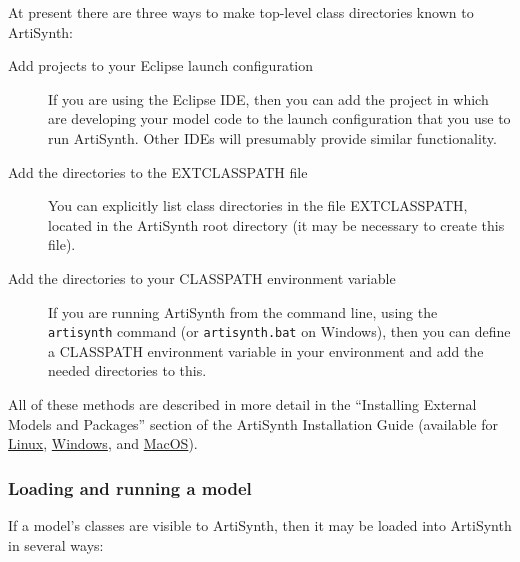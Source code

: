 At present there are three ways to make top-level class directories
known to ArtiSynth:

\begin{description}

\item[Add projects to your Eclipse launch configuration]\mbox{}

If you are using the Eclipse IDE, then you can add the project in
which are developing your model code to the launch configuration that
you use to run ArtiSynth. Other IDEs will presumably provide similar
functionality.

\item[Add the directories to the EXTCLASSPATH file]\mbox{}

You can explicitly list class directories in the file EXTCLASSPATH,
located in the ArtiSynth root directory (it may be necessary to create
this file).

\item[Add the directories to your CLASSPATH environment variable]\mbox{}

If you are running ArtiSynth from the command line, using the {\tt
artisynth} command (or {\tt artisynth.bat} on Windows), then you can
define a CLASSPATH environment variable in your environment and add
the needed directories to this.

\end{description}

All of these methods are described in more detail in the ``Installing
External Models and Packages'' section of the ArtiSynth Installation
Guide (available for \href{../installation/linuxInstallation.html}{Linux}, 
\href{../installation/windowsInstallation.html}{Windows}, and
\href{../installation/macosInstallation.html}{MacOS}).

\subsubsection{Loading and running a model}
\label{LoadingAndRunning:sec}

If a model's classes are visible to ArtiSynth, then it may be loaded
into ArtiSynth in several ways:

